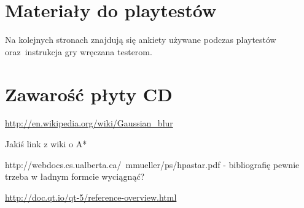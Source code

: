 \documentclass[licencjacka]{pracamgr}
\begin{document}
\chapter{Materiały do playtestów}
Na kolejnych stronach znajdują się ankiety używane podczas playtestów
oraz~instrukcja gry wręczana testerom.

    
    
    

  \chapter{Zawarość płyty CD}


\begin{thebibliography}{99}
  \item{\url{http://en.wikipedia.org/wiki/Gaussian_blur}}
  \item{Jakiś link z wiki o A*}
  \item{http://webdocs.cs.ualberta.ca/~mmueller/ps/hpastar.pdf - bibliografię pewnie trzeba w ładnym formcie wyciągnąć?}
  \item{\url{http://doc.qt.io/qt-5/reference-overview.html}}

\end{thebibliography}
\end{document}
